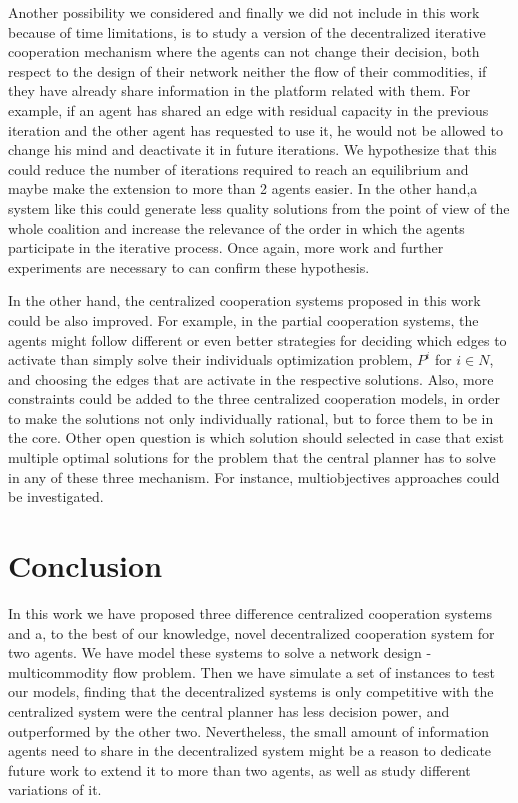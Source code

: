 \documentclass[review]{elsarticle}
\begin{document}
Another possibility we considered and finally we did not include in this work because of time limitations, is to study a version of the 
decentralized iterative cooperation mechanism where the agents can not change their decision, both respect to the design of their network neither the flow of their commodities, if they have already share information in the platform related with them. For example, if an agent has shared an edge with residual capacity in the previous iteration and the other agent has requested to use it, he would not be allowed to change his mind and deactivate it in future iterations. We hypothesize that this could reduce the number of iterations required  to reach an equilibrium and maybe make the extension to more than 2 agents easier. In the other hand,a system like this could generate less quality solutions from the point of view of the whole coalition and increase the relevance of the order in which the agents participate in the iterative process. Once again, more work and further experiments are necessary to can confirm these hypothesis.

In the other hand, the centralized cooperation systems proposed in this work could be also improved. For example, in the partial cooperation systems, the agents might follow different or even better strategies for deciding which edges to activate than simply solve their individuals optimization problem, $P^i$ for $i\in N$, and choosing the edges that are activate in the respective solutions. Also, more constraints could be added to the three centralized cooperation models, in order to make the solutions not only individually rational, but to force them to be in the core. Other open question is which solution should selected in case that exist multiple optimal solutions for the problem that the central planner has to solve in any of these three mechanism. For instance, multiobjectives approaches could be investigated.


\section{Conclusion} \label{seq:conclusion}

In this work we have proposed three difference centralized cooperation systems and a, to the best of our knowledge, novel decentralized cooperation system for two agents. We have model these systems to solve a network design - multicommodity flow problem. Then we have simulate a set of instances to test our models, finding that the decentralized systems is only competitive with the centralized system were the central planner has less decision power, and outperformed by the other two. Nevertheless, the small amount of information agents need to share in the decentralized system might be a reason to dedicate future work to extend it to more than two agents, as well as study different variations of it. 
\end{document}
